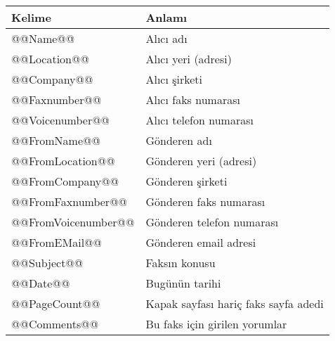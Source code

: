 \documentclass[a4paper,10pt]{scrartcl}
\begin{document}
\begin{center}
\begin{tabular}{|l|l|}
\hline
\bfseries Kelime & \bfseries Anlamı \\
\hline\hline
\ttfamily @@Name@@ & Alıcı adı \\\hline
\ttfamily @@Location@@ & Alıcı yeri (adresi) \\\hline
\ttfamily @@Company@@ & Alıcı şirketi \\\hline
\ttfamily @@Faxnumber@@ & Alıcı faks numarası \\\hline
\ttfamily @@Voicenumber@@ & Alıcı telefon numarası \\\hline
\ttfamily @@FromName@@ & Gönderen adı \\\hline
\ttfamily @@FromLocation@@ & Gönderen yeri (adresi) \\\hline
\ttfamily @@FromCompany@@ & Gönderen şirketi \\\hline
\ttfamily @@FromFaxnumber@@ & Gönderen faks numarası \\\hline
\ttfamily @@FromVoicenumber@@ & Gönderen telefon numarası \\\hline
\ttfamily @@FromEMail@@ & Gönderen email adresi \\\hline
\ttfamily @@Subject@@ & Faksın konusu \\\hline
\ttfamily @@Date@@ & Bugünün tarihi \\\hline
\ttfamily @@PageCount@@ & Kapak sayfası hariç faks sayfa adedi \\\hline
\ttfamily @@Comments@@ & Bu faks için girilen yorumlar \\\hline
\end{tabular}
\end{center}
\end{document}
